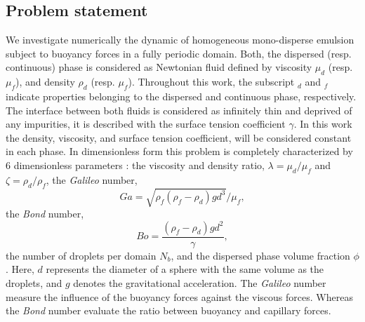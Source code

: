 

\subsection{Problem statement}
We investigate numerically the dynamic of homogeneous mono-disperse emulsion subject to buoyancy forces in a fully periodic domain. 
Both, the dispersed (resp. continuous) phase is considered as Newtonian fluid defined by viscosity $\mu_d$ (resp. $\mu_f$), and density $\rho_d$ (resp. $\mu_f$).
Throughout this work, the subscript $_d$ and $_f$ indicate properties belonging to the dispersed and continuous phase, respectively. 
The interface between both fluids is considered as infinitely thin and deprived of any impurities, it is described with the surface tension coefficient $\gamma$. 
In this work the density, viscosity, and surface tension coefficient, will be considered constant in each phase.
In dimensionless form this problem is completely characterized by $6$ dimensionless parameters :  the viscosity and density ratio, $\lambda = \mu_d / \mu_f$ and $\zeta = \rho_d / \rho_f$,  
the \textit{Galileo} number, 
\begin{equation*}
    Ga =\sqrt{\rho_f(\rho_f - \rho_d) g d^3} / \mu_f,
\end{equation*}
the \textit{Bond} number, 
\begin{equation*}
    Bo =\frac{(\rho_f - \rho_d) g d^2}{\gamma},
\end{equation*}
the number of droplets per domain $N_b$, and the dispersed phase volume fraction $\phi$. 
Here, $d$ represents the diameter of a sphere with the same volume as the droplets, and $g$ denotes the gravitational acceleration.
The \textit{Galileo} number measure the influence of the buoyancy forces against the viscous forces.
Whereas the \textit{Bond} number evaluate the ratio between buoyancy and capillary forces. 

